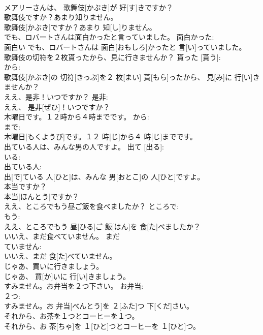 \documentclass[8pt]{extreport}
\begin{document}
\begin{CJK}{UTF8}{min}
\\	メアリーさんは、 歌舞伎[かぶき]が 好[す]きですか？		
\\	歌舞伎ですか？あまり知りません。	
\\	歌舞伎[かぶき]ですか？あまり 知[し]りません。	
\\	でも、ロバートさんは面白かったと言っていました。	面白かった: 
\\	面白い	でも、ロバートさんは 面白[おもしろ]かったと 言[い]っていました。		
\\	歌舞伎の切符を２枚貰ったから、見に行きませんか？	貰った [貰う]: 
\\	から: 
\\	歌舞伎[かぶき]の 切符[きっぷ]を２ 枚[まい] 貰[もら]ったから、 見[み]に 行[い]きませんか？		
\\	ええ、是非！いつですか？	是非: 
\\	ええ、 是非[ぜひ]！いつですか？		
\\	木曜日です。１２時から４時までです。	から: 
\\	まで: 
\\	木曜日[もくようび]です。１２ 時[じ]から４ 時[じ]までです。		
\\	出ている人は、みんな男の人ですよ。	出て [出る]: 
\\	いる: 
\\	出ている人: 
\\	出[で]ている 人[ひと]は、みんな 男[おとこ]の 人[ひと]ですよ。		
\\	本当ですか？	
\\	本当[ほんとう]ですか？	
\\	ええ、ところでもう昼ご飯を食べましたか？	ところで: 
\\	もう: 
\\	ええ、ところでもう 昼[ひる]ご 飯[はん]を 食[た]べましたか？		
\\	いいえ、まだ食べていません。	まだ 
\\	ていません: 
\\	いいえ、まだ 食[た]べていません。		
\\	じゃあ、買いに行きましょう。	
\\	じゃあ、 買[か]いに 行[い]きましょう。	
\\	すみません。お弁当を２つ下さい。	お弁当: 
\\	２つ: 
\\	すみません。お 弁当[べんとう]を ２[ふた]つ 下[くだ]さい。		
\\	それから、お茶を１つとコーヒーを１つ。	
\\	それから、お 茶[ちゃ]を １[ひと]つとコーヒーを １[ひと]つ。	

\end{CJK}
\end{document}
